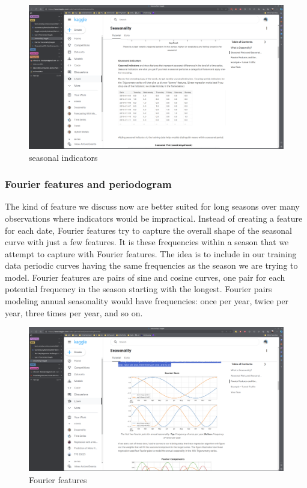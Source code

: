 \documentclass[12pt]{report}
\begin{document}
\begin{figure}[htbp]
  \begin{center}
    \includegraphics[trim =30cm 8.0cm 20cm 27cm, clip, scale=0.4]{pics/seasonal_indicator.png}
    \caption{seasonal indicators}
  \end{center}
\end{figure}

\subsubsection{Fourier features and periodogram}

The kind of feature we discuss now are better suited for long seasons over many observations where indicators would be impractical. Instead of creating a feature for each date, Fourier features try to capture the overall shape of the seasonal curve with just a few features. It is these frequencies within a season that we attempt to capture with Fourier features. The idea is to include in our training data periodic curves having the same frequencies as the season we are trying to model. Fourier features are pairs of sine and cosine curves, one pair for each potential frequency in the season starting with the longest. Fourier pairs modeling annual seasonality would have frequencies: once per year, twice per year, three times per year, and so on.

\begin{figure}[htbp]
  \begin{center}
    \includegraphics[trim =30cm 10.0cm 20cm 15cm, clip, scale=0.4]{pics/fourier.png}
    \caption{Fourier features}
    \label{default}
  \end{center}
\end{figure}
\end{document}
